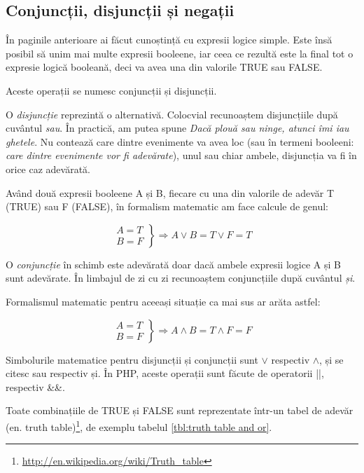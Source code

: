 \subsection{Conjuncții, disjuncții și negații}
În paginile anterioare ai făcut cunoștință cu expresii logice
simple. Este însă posibil să unim mai multe expresii booleene,
iar ceea ce rezultă este la final tot o expresie logică booleană,
deci va avea una din valorile TRUE sau FALSE.

Aceste operații se numesc conjuncții și disjuncții.

O \textsl{disjuncție}
reprezintă o alternativă. Colocvial recunoaștem disjuncțiile
după cuvântul \textit{sau}. În practică, am putea spune
\textit{Dacă plouă sau ninge, atunci îmi iau ghetele}. Nu contează
care dintre evenimente va avea loc (sau în termeni booleeni: \textit{care dintre
evenimente {\glqq}vor fi adevărate{\grqq}}), unul sau chiar ambele, disjuncția
va fi în orice caz adevărată.

Având două expresii booleene A și B, fiecare cu una din valorile de
adevăr T (TRUE) sau F (FALSE), în formalism matematic am face calcule de genul:

\[ 
  \left.
  \begin{array}{c}
    A = T\\
    B = F
  \end{array}
  \right\}
  \Rightarrow A \lor B = T \lor F = T
\]

O \textsl{conjuncție} în schimb este adevărată doar dacă ambele expresii logice A și B
sunt adevărate. În limbajul de zi cu zi recunoaștem conjuncțiile după cuvântul \textit{și}.

Formalismul matematic pentru aceeași situație ca mai sus ar arăta astfel:

\[ 
  \left.
  \begin{array}{c}
    A = T\\
    B = F
  \end{array}
  \right\}
  \Rightarrow A \land B = T \land F = F
\]

Simbolurile matematice pentru disjuncții și conjuncții sunt $\lor$ respectiv $\land$, și se citesc
{\glqq}sau{\grqq} respectiv {\glqq}și{\grqq}. În PHP, aceste operații sunt făcute de operatorii {\glqq}||{\grqq}, respectiv {\glqq}\&\&{\grqq}.

Toate combinațiile de TRUE și FALSE sunt reprezentate într-un tabel de
adevăr (en. truth
table)\footnote{\url{http://en.wikipedia.org/wiki/Truth_table}}, de exemplu
tabelul \ref{tbl:truth table and or}.

